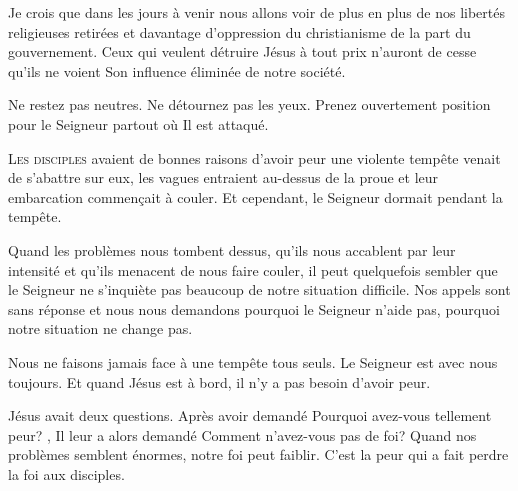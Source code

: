 Je crois que dans les jours à venir nous allons voir de plus en plus
 de nos libertés religieuses retirées et davantage d'oppression
 du christianisme 
 de la part du gouvernement.
 Ceux qui veulent détruire Jésus à tout prix n'auront de cesse
 qu'ils ne voient Son influence éliminée de notre société.

Ne restez pas neutres. Ne détournez pas les yeux.
 Prenez ouvertement position pour le Seigneur partout où Il est attaqué.

\dvrule






\lettrine{L}{es disciples} avaient de bonnes raisons d'avoir peur\frcolon{}
 une violente tempête venait de s'abattre sur eux,
 les vagues entraient au-dessus de la proue et leur embarcation
 commen\c{c}ait à couler. Et cependant, le Seigneur dormait pendant la tempête.

Quand les problèmes nous tombent dessus, qu'ils nous accablent
 par leur intensité et qu'ils menacent de nous faire couler,
 il peut quelquefois sembler que le Seigneur ne s'inquiète pas beaucoup
 de notre situation difficile. Nos appels sont sans réponse
 et nous nous demandons pourquoi le Seigneur n'aide pas,
 pourquoi notre situation ne change pas.

Nous ne faisons jamais face à une tempête tous seuls.
 Le Seigneur est avec nous \ocadr toujours.
 Et quand Jésus est à bord, il n'y a pas besoin d'avoir peur.

Jésus avait deux questions. Après avoir demandé\frcolon{} 
 \Og Pourquoi avez-vous tellement peur? \Fg{}, Il leur a alors demandé\frcolon{} 
 \Og Comment n'avez-vous pas de foi? \Fg{}
 Quand nos problèmes semblent énormes, notre foi peut faiblir.
 C'est la peur qui a fait perdre la foi aux disciples.


